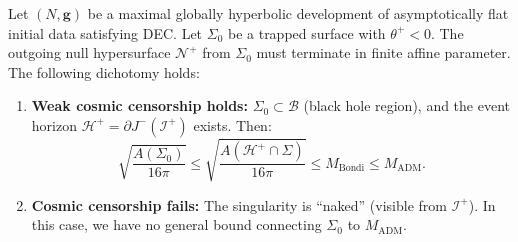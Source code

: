 \begin{theorem}\label{thm:singbypass}
Let $(N, \mathbf{g})$ be a maximal globally hyperbolic development of asymptotically flat initial data satisfying DEC. Let $\Sigma_0$ be a trapped surface with $\theta^+ < 0$. The outgoing null hypersurface $\mathcal{N}^+$ from $\Sigma_0$ must terminate in finite affine parameter. The following dichotomy holds:
\begin{enumerate}
    \item[(A)] \textbf{Weak cosmic censorship holds:} $\Sigma_0 \subset \mathcal{B}$ (black hole region), and the event horizon $\mathcal{H}^+ = \partial J^-(\mathscr{I}^+)$ exists. Then:
    \begin{equation}
        \sqrt{\frac{A(\Sigma_0)}{16\pi}} \leq \sqrt{\frac{A(\mathcal{H}^+ \cap \Sigma)}{16\pi}} \leq M_{\mathrm{Bondi}} \leq M_{\mathrm{ADM}}.
    \end{equation}
    \item[(B)] \textbf{Cosmic censorship fails:} The singularity is ``naked'' (visible from $\mathscr{I}^+$). In this case, we have no general bound connecting $\Sigma_0$ to $M_{\mathrm{ADM}}$.
\end{enumerate}
\end{theorem}

